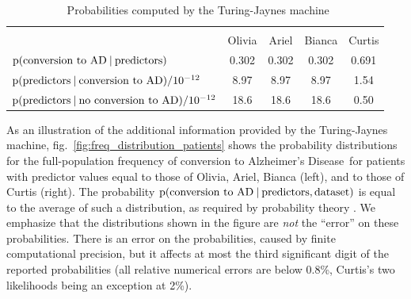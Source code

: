 \documentclass[utf8]{FrontiersinHarvard} %
\newcommand*{\wrench}{{\fontencoding{U}\fontfamily{fontawesomethree}\selectfont\symbol{114}}}
\newcommand{\mynotew}[1]{{\color{notecolour}\wrench\ #1}}
\newcommand*{\sects}{\S\S}%
\newcommand*{\fig}{fig.}%
\newcommand*{\eg}{{e.g.}}
\newcommand*{\p}{\mathrm{p}}%
\renewcommand*{\|}[1][]{\nonscript\:#1\vert\nonscript\:\mathopen{}}
\newcommand*{\ad}{Alzheimer's Disease}
\newcommand*{\tjm}{Turing-Jaynes machine}
\begin{document}
\begin{table}[!h]
  \centering
  \begin{tabular}{lcccc}
    \hline\\[-1.5\jot]
    &{\small Olivia} &{\small Ariel} &{\small Bianca} &{\small Curtis}
    \\[\jot]
    {\small $\p(\text{conversion to AD} \| \text{predictors})$}&
    0.302&0.302&0.302&0.691
    \\
    {\small $\p(\text{predictors} \| \text{conversion to AD})/10^{-12}$}&
    8.97&8.97&8.97&1.54
    \\
    {\small $\p(\text{predictors} \| \text{no conversion to AD})/10^{-12}$}&
    18.6&18.6&18.6&0.50
    \\[\jot]
    \hline
  \end{tabular}
    \caption{\mynotew{Probabilities computed by the \tjm}}\label{tab:prob_likelihoods_patients}
\end{table}

As an illustration of the additional information provided by the \tjm, \fig~\ref{fig:freq_distribution_patients} shows the probability distributions for the full-population frequency of conversion to \ad\ for patients with predictor values equal to those of Olivia, Ariel, Bianca (left), and to those of Curtis (right). The probability $\p(\text{conversion to AD} \| \text{predictors}, \text{dataset})$ is equal to the average of such a distribution, as required by probability theory \citep[\eg][\sects~4.2--4.3]{bernardoetal1994_r2000}. We emphasize that the distributions shown in the figure are \emph{not} the \enquote{error} on these probabilities. There is an error on the probabilities, caused by finite computational precision, but it affects at most the third significant digit of the reported probabilities (all relative numerical errors are below 0.8\%, Curtis's two likelihoods being an exception at 2\%).
\end{document}

